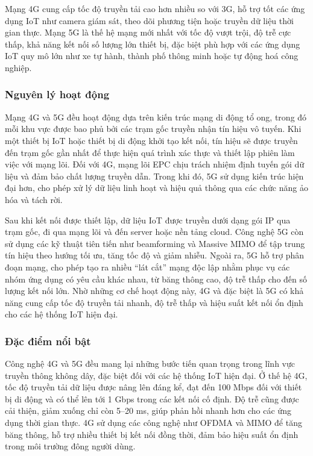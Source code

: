 Mạng 4G cung cấp tốc độ truyền tải cao hơn nhiều so với 3G, hỗ trợ tốt các ứng dụng IoT như camera giám sát, theo dõi phương tiện hoặc truyền dữ liệu thời gian thực. Mạng 5G là thế hệ mạng mới nhất với tốc độ vượt trội, độ trễ cực thấp, khả năng kết nối số lượng lớn thiết bị, đặc biệt phù hợp với các ứng dụng IoT quy mô lớn như xe tự hành, thành phố thông minh hoặc tự động hoá công nghiệp.
\subsubsection{Nguyên lý hoạt động}
Mạng 4G và 5G đều hoạt động dựa trên kiến trúc mạng di động tổ ong, trong đó mỗi khu vực được bao phủ bởi các trạm gốc truyền nhận tín hiệu vô tuyến. Khi một thiết bị IoT hoặc thiết bị di động khởi tạo kết nối, tín hiệu sẽ được truyền đến trạm gốc gần nhất để thực hiện quá trình xác thực và thiết lập phiên làm việc với mạng lõi. Đối với 4G, mạng lõi EPC chịu trách nhiệm định tuyến gói dữ liệu và đảm bảo chất lượng truyền dẫn. Trong khi đó, 5G sử dụng kiến trúc hiện đại hơn, cho phép xử lý dữ liệu linh hoạt và hiệu quả thông qua các chức năng ảo hóa và tách rời.

Sau khi kết nối được thiết lập, dữ liệu IoT được truyền dưới dạng gói IP qua trạm gốc, đi qua mạng lõi và đến server hoặc nền tảng cloud. Công nghệ 5G còn sử dụng các kỹ thuật tiên tiến như beamforming và Massive MIMO để tập trung tín hiệu theo hướng tối ưu, tăng tốc độ và giảm nhiễu. Ngoài ra, 5G hỗ trợ phân đoạn mạng, cho phép tạo ra nhiều “lát cắt” mạng độc lập nhằm phục vụ các nhóm ứng dụng có yêu cầu khác nhau, từ băng thông cao, độ trễ thấp cho đến số lượng kết nối lớn. Nhờ những cơ chế hoạt động này, 4G và đặc biệt là 5G có khả năng cung cấp tốc độ truyền tải nhanh, độ trễ thấp và hiệu suất kết nối ổn định cho các hệ thống IoT hiện đại.

\subsubsection{Đặc điểm nổi bật}
Công nghệ 4G và 5G đều mang lại những bước tiến quan trọng trong lĩnh vực truyền thông không dây, đặc biệt đối với các hệ thống IoT hiện đại. Ở thế hệ 4G, tốc độ truyền tải dữ liệu được nâng lên đáng kể, đạt đến 100 Mbps đối với thiết bị di động và có thể lên tới 1 Gbps trong các kết nối cố định. Độ trễ cũng được cải thiện, giảm xuống chỉ còn 5–20 ms, giúp phản hồi nhanh hơn cho các ứng dụng thời gian thực. 4G sử dụng các công nghệ như OFDMA và MIMO để tăng băng thông, hỗ trợ nhiều thiết bị kết nối đồng thời, đảm bảo hiệu suất ổn định trong môi trường đông người dùng.

